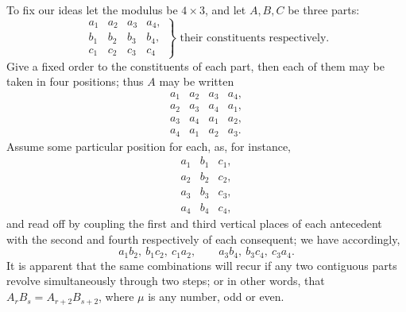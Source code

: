 \documentclass[11pt]{article}
\begin{document}
To fix our ideas let the modulus be $4\times3$, and let $A,B,C$ be three parts:
\[
\left.\begin{array}{llll}
a_1&a_2&a_3&a_4,\\
b_1&b_2&b_3&b_4,\\
c_1&c_2&c_3&c_4
\end{array}\right\}\text{ their constituents respectively.}
\]
Give a fixed order to the constituents of each part, then each of them may be taken in four positions; thus $A$ may be written
\[
\begin{array}{llll}
a_1&a_2&a_3&a_4,\\
a_2&a_3&a_4&a_1,\\
a_3&a_4&a_1&a_2,\\
a_4&a_1&a_2&a_3.
\end{array}
\]
Assume some particular position for each, as, for instance,
\[
\begin{array}{lll}
a_1&b_1&c_1,\\
a_2&b_2&c_2,\\
a_3&b_3&c_3,\\
a_4&b_4&c_4,
\end{array}
\]
and read off by coupling the first and third vertical places of each antecedent with the second and fourth respectively of each consequent; we have accordingly,
\[
a_1b_2,\ b_1c_2,\ c_1a_2,
\qquad
 a_3b_4,\ b_3c_4,\ c_3a_4.
\]
It is apparent that the same combinations will recur if any two contiguous parts revolve simultaneously through two steps; or in other words, that $A_rB_s=A_{r+2}B_{s+2}$, where $\mu$ is any number, odd or even.
\end{document}
